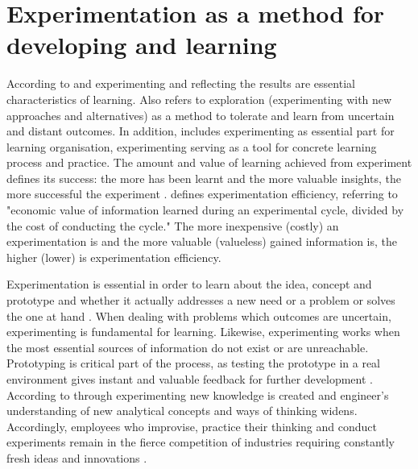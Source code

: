 \section{Experimentation as a method for developing and learning}
According to \citet{edmondson1999psychological} and \citet{henderson1990architectural} experimenting and reflecting the results are essential characteristics of learning. Also\citet{march1991exploration} refers to exploration (experimenting with new approaches and alternatives) as a method to tolerate and learn from uncertain and distant outcomes. In addition, \citet{garvin2008yours} includes experimenting as essential part for learning organisation, experimenting serving as a tool for concrete learning process and practice. The amount and value of learning achieved from experiment defines its success: the more has been learnt and the more valuable insights, the more successful the experiment \citep{thomke2003r}. \citet{thomke1998managing} defines experimentation efficiency, referring to "economic value of information learned during an experimental cycle, divided by the cost of conducting the cycle." The more inexpensive (costly) an experimentation is and the more valuable (valueless) gained information is, the higher (lower) is experimentation efficiency. 

Experimentation is essential in order to learn about the idea, concept and prototype and whether it actually addresses a new need or a problem or solves the one at hand \citep{thomke2001enlightened}. When dealing with problems which outcomes are uncertain, experimenting is fundamental for learning. Likewise, experimenting works when the most essential sources of information do not exist or are unreachable. \citep{lee2004mixed} Prototyping is critical part of the process, as testing the prototype in a real environment gives instant and valuable feedback for further development \citep{thomke2001enlightened}. According to \citet{vincenti1990engineers} through experimenting new knowledge is created and engineer's understanding of new analytical concepts and ways of thinking widens. Accordingly, employees who improvise, practice their thinking and conduct experiments remain in the fierce competition of industries requiring constantly fresh ideas and innovations \citep{ciborra1996platform}.


